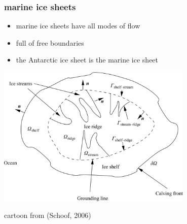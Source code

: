 \documentclass{beamer}
\begin{document}
\begin{frame}
  \frametitle{marine ice sheets}

\begin{itemize}
\item marine ice sheets have all modes of flow
\item full of free boundaries
\item the Antarctic ice sheet is the marine ice sheet
\end{itemize}

\begin{center}
\includegraphics[width=0.7\textwidth]{schoof-planform}

\tiny cartoon from (Schoof, 2006)
\end{center}
\end{frame}
\end{document}
